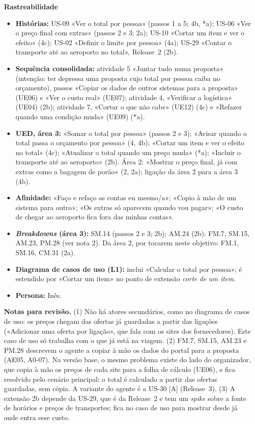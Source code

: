 \documentclass[11pt,a4paper]{article}
\newcommand{\reg}[1]{{\footnotesize\textcolor{pendente}{(#1)}}}
\newenvironment{usecase}[2]{%
  \par\medskip\noindent{\large\bfseries\color{roamly}#1: #2}\par\smallskip\small\noindent\ignorespaces}{\par\medskip}
\begin{document}
\begin{usecase}{UC-02}{Saber o total real por pessoa}
\textbf{Rastreabilidade}
\begin{itemize}
  \item \textbf{Histórias:} US-09 «Ver o total por pessoa» (passos 1 a 5; 4b, *a); US-06 «Ver o preço final com extras» (passos 2 e 3; 2a); US-10 «Cortar um item e ver o efeito» (4c); US-02 «Definir o limite por pessoa» (4a); US-29 «Contar o transporte até ao aeroporto no total», Release~2 (2b).
  \item \textbf{Sequência consolidada:} atividade 5 «Juntar tudo numa proposta» (intenção: ter depressa uma proposta cujo total por pessoa caiba no orçamento), passos «Copiar os dados de outros sistemas para a proposta» \reg{UE06} e «Ver o custo real» \reg{UE07}; atividade 4, «Verificar a logística» \reg{UE04} (2b); atividade 7, «Cortar o que não cabe» \reg{UE12} (4c) e «Refazer quando uma condição muda» \reg{UE09} (*a).
  \item \textbf{UED, área 3:} «Somar o total por pessoa» (passos 2 e 3); «Avisar quando o total passa o orçamento por pessoa» (4, 4b); «Cortar um item e ver o efeito no total» (4c); «Atualizar o total quando um preço muda» (*a); «Incluir o transporte até ao aeroporto» (2b). Área 2: «Mostrar o preço final, já com extras como a bagagem de porão» (2, 2a); ligação da área 2 para a área 3 (4b).
  \item \textbf{Afinidade:} «Faço e refaço as contas eu mesmo/a»; «Copio à mão de um sistema para outro»; «Os extras só aparecem quando vou pagar»; «O custo de chegar ao aeroporto fica fora das minhas contas».
  \item \textbf{\textit{Breakdowns} (área 3):} SM.14 (passos 2 e 3; 2b); AM.24 (2b); FM.7, SM.15, AM.23, PM.28 (ver nota 2). Da área 2, por tocarem neste objetivo: FM.1, SM.16, CM.31 (2a).
  \item \textbf{Diagrama de casos de uso (L1):} inclui «Calcular o total por pessoa»; é estendido por «Cortar um item» no ponto de extensão \textit{corte de um item}.
  \item \textbf{Persona:} Inês.
\end{itemize}
\end{usecase}

\medskip
{\footnotesize\textbf{Notas para revisão.}
(1) Não há atores secundários, como no diagrama de casos de uso: os preços chegam das ofertas já guardadas a partir das ligações («Adicionar uma oferta por ligação», que fala com os sites dos fornecedores). Este caso de uso só trabalha com o que já está na viagem.
(2) FM.7, SM.15, AM.23 e PM.28 descrevem o agente a copiar à mão os dados do portal para a proposta \reg{AE05, A0-07}. Na versão base, o mesmo problema existe do lado do organizador, que copia à mão os preços de cada site para a folha de cálculo \reg{UE06}, e fica resolvido pelo cenário principal: o total é calculado a partir das ofertas guardadas, sem cópia. A variante do agente é a US-30 [A] (Release~3).
(3) A extensão 2b depende da US-29, que é da Release~2 e tem um \textit{spike} sobre a fonte de horários e preços de transportes; fica no caso de uso para mostrar desde já onde entra esse custo.\par}
\end{document}
